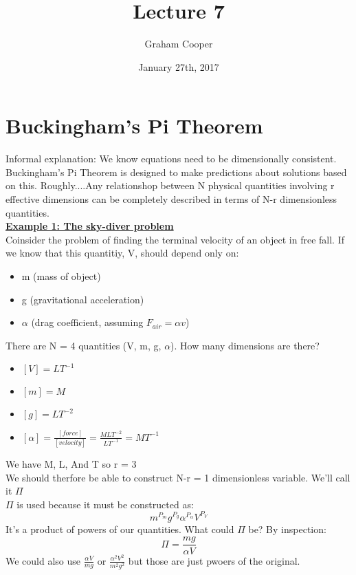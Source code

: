 \documentclass[12pt]{article}
\title{\vspace{-15ex}Lecture 7\vspace{-1ex}}
\date{January 27th, 2017}
\author{Graham Cooper}
\newcommand{\myt}[1]{\textbf{\underline{#1}}}
\begin{document}
	\maketitle
	\section*{Buckingham's Pi Theorem}
	
	Informal explanation: We know equations need to be dimensionally consistent. Buckingham's Pi Theorem is designed to make predictions about solutions based on this. Roughly....Any relationshop between N physical quantities involving r effective dimensions can be completely described in terms of N-r dimensionless quantities.\\
	
	\myt{Example 1: The sky-diver problem}\\
	Coinsider the problem of finding the terminal velocity of an object in free fall. If we know that this quantitiy, V, should depend only on:\\
	\begin{itemize}
		\item m (mass of object)
		\item g (gravitational acceleration)
		\item $\alpha$ (drag coefficient, assuming $F_{air} = \alpha v$)
	\end{itemize}
	
	There are N = 4 quantities (V, m, g, $\alpha$). How many dimensions are there?\\
	\begin{itemize}
		\item $[V] = LT^{-1}$
		\item $[m] = M$
		\item $[g] = LT^{-2}$
		\item $[\alpha] = \frac{[force]}{[velocity]} = \frac{MLT^{-2}}{LT^{-1}} = MT^{-1}$
	\end{itemize}

	We have M, L, And T so r = 3\\
	We should therfore be able to construct N-r = 1 dimensionless variable. We'll call it $\Pi$\\
	$\Pi$ is used because it must be constructed as:\\
	
	$$m^{P_m}g^{P_g}\alpha^{P_{\alpha}}V^{P_V}$$
	It's a product of powers of our quantities. What could $\Pi$ be? By inspection:\\
	$$\Pi = \frac{mg}{\alpha V}$$
	We could also use $\frac{\alpha V}{mg}$ or $\frac{\alpha^2 V^2}{m^2g^2}$ but those are just pwoers of the original.\\
	
\end{document}
